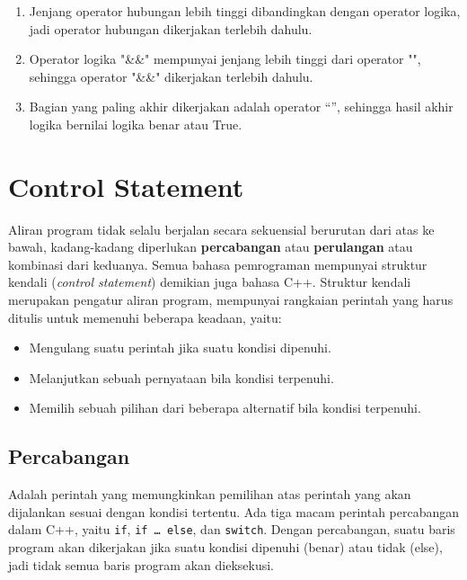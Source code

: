 \begin{enumerate}
\def\labelenumi{\arabic{enumi}.}
\tightlist
\item
  Jenjang operator hubungan lebih tinggi dibandingkan dengan operator
  logika, jadi operator hubungan dikerjakan terlebih dahulu.
\item
  Operator logika "\&\&" mempunyai jenjang lebih tinggi dari operator
  "\textbar{}\textbar{}", sehingga operator "\&\&" dikerjakan
  terlebih dahulu.
\item
  Bagian yang paling akhir dikerjakan adalah operator
  ``\textbar{}\textbar{}'', sehingga hasil akhir logika bernilai logika
  benar atau True.
\end{enumerate}

\section{Control Statement}\label{control-statement}

Aliran program tidak selalu berjalan secara sekuensial berurutan dari
atas ke bawah, kadang-kadang diperlukan \textbf{percabangan} atau
\textbf{perulangan} atau kombinasi dari keduanya. Semua bahasa
pemrograman mempunyai struktur kendali (\emph{control statement})
demikian juga bahasa C++. Struktur kendali merupakan pengatur aliran
program, mempunyai rangkaian perintah yang harus ditulis untuk memenuhi
beberapa keadaan, yaitu:

\begin{itemize}
\tightlist
\item
  Mengulang suatu perintah jika suatu kondisi dipenuhi.
\item
  Melanjutkan sebuah pernyataan bila kondisi terpenuhi.
\item
  Memilih sebuah pilihan dari beberapa alternatif bila kondisi
  terpenuhi.
\end{itemize}

\subsection{Percabangan}\label{a.-percabangan}

Adalah perintah yang memungkinkan pemilihan atas perintah yang akan
dijalankan sesuai dengan kondisi tertentu. Ada tiga macam perintah
percabangan dalam C++, yaitu \texttt{if}, \texttt{if\ \ldots{}\ else},
dan \texttt{switch}. Dengan percabangan, suatu baris program akan
dikerjakan jika suatu kondisi dipenuhi (benar) atau tidak (else), jadi
tidak semua baris program akan dieksekusi.

